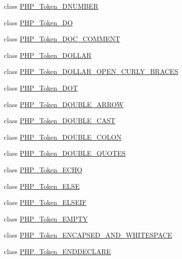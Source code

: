 \begin{DoxyCompactItemize}
\item 
class \mbox{\hyperlink{class_p_h_p___token___d_n_u_m_b_e_r}{P\+H\+P\+\_\+\+Token\+\_\+\+D\+N\+U\+M\+B\+ER}}
\item 
class \mbox{\hyperlink{class_p_h_p___token___d_o}{P\+H\+P\+\_\+\+Token\+\_\+\+DO}}
\item 
class \mbox{\hyperlink{class_p_h_p___token___d_o_c___c_o_m_m_e_n_t}{P\+H\+P\+\_\+\+Token\+\_\+\+D\+O\+C\+\_\+\+C\+O\+M\+M\+E\+NT}}
\item 
class \mbox{\hyperlink{class_p_h_p___token___d_o_l_l_a_r}{P\+H\+P\+\_\+\+Token\+\_\+\+D\+O\+L\+L\+AR}}
\item 
class \mbox{\hyperlink{class_p_h_p___token___d_o_l_l_a_r___o_p_e_n___c_u_r_l_y___b_r_a_c_e_s}{P\+H\+P\+\_\+\+Token\+\_\+\+D\+O\+L\+L\+A\+R\+\_\+\+O\+P\+E\+N\+\_\+\+C\+U\+R\+L\+Y\+\_\+\+B\+R\+A\+C\+ES}}
\item 
class \mbox{\hyperlink{class_p_h_p___token___d_o_t}{P\+H\+P\+\_\+\+Token\+\_\+\+D\+OT}}
\item 
class \mbox{\hyperlink{class_p_h_p___token___d_o_u_b_l_e___a_r_r_o_w}{P\+H\+P\+\_\+\+Token\+\_\+\+D\+O\+U\+B\+L\+E\+\_\+\+A\+R\+R\+OW}}
\item 
class \mbox{\hyperlink{class_p_h_p___token___d_o_u_b_l_e___c_a_s_t}{P\+H\+P\+\_\+\+Token\+\_\+\+D\+O\+U\+B\+L\+E\+\_\+\+C\+A\+ST}}
\item 
class \mbox{\hyperlink{class_p_h_p___token___d_o_u_b_l_e___c_o_l_o_n}{P\+H\+P\+\_\+\+Token\+\_\+\+D\+O\+U\+B\+L\+E\+\_\+\+C\+O\+L\+ON}}
\item 
class \mbox{\hyperlink{class_p_h_p___token___d_o_u_b_l_e___q_u_o_t_e_s}{P\+H\+P\+\_\+\+Token\+\_\+\+D\+O\+U\+B\+L\+E\+\_\+\+Q\+U\+O\+T\+ES}}
\item 
class \mbox{\hyperlink{class_p_h_p___token___e_c_h_o}{P\+H\+P\+\_\+\+Token\+\_\+\+E\+C\+HO}}
\item 
class \mbox{\hyperlink{class_p_h_p___token___e_l_s_e}{P\+H\+P\+\_\+\+Token\+\_\+\+E\+L\+SE}}
\item 
class \mbox{\hyperlink{class_p_h_p___token___e_l_s_e_i_f}{P\+H\+P\+\_\+\+Token\+\_\+\+E\+L\+S\+E\+IF}}
\item 
class \mbox{\hyperlink{class_p_h_p___token___e_m_p_t_y}{P\+H\+P\+\_\+\+Token\+\_\+\+E\+M\+P\+TY}}
\item 
class \mbox{\hyperlink{class_p_h_p___token___e_n_c_a_p_s_e_d___a_n_d___w_h_i_t_e_s_p_a_c_e}{P\+H\+P\+\_\+\+Token\+\_\+\+E\+N\+C\+A\+P\+S\+E\+D\+\_\+\+A\+N\+D\+\_\+\+W\+H\+I\+T\+E\+S\+P\+A\+CE}}
\item 
class \mbox{\hyperlink{class_p_h_p___token___e_n_d_d_e_c_l_a_r_e}{P\+H\+P\+\_\+\+Token\+\_\+\+E\+N\+D\+D\+E\+C\+L\+A\+RE}}

\end{DoxyCompactItemize}
